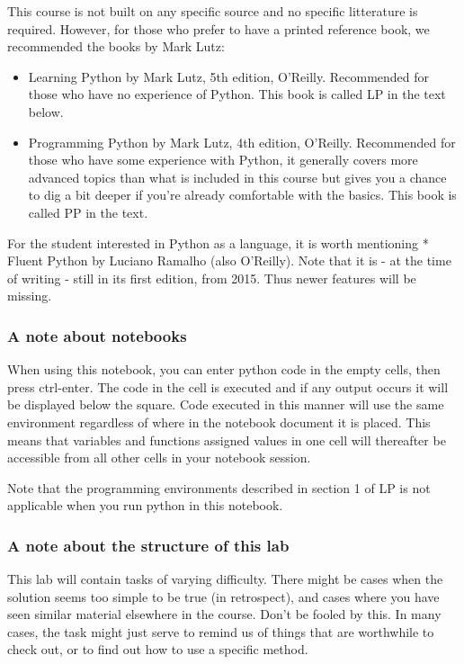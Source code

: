 \documentclass[11pt]{article}
\begin{document}
This course is not built on any specific source and no specific
litterature is required. However, for those who prefer to have a printed
reference book, we recommended the books by Mark Lutz:

\begin{itemize}
\item
  Learning Python by Mark Lutz, 5th edition, O'Reilly. Recommended for
  those who have no experience of Python. This book is called LP in the
  text below.
\item
  Programming Python by Mark Lutz, 4th edition, O'Reilly. Recommended
  for those who have some experience with Python, it generally covers
  more advanced topics than what is included in this course but gives
  you a chance to dig a bit deeper if you're already comfortable with
  the basics. This book is called PP in the text.
\end{itemize}

For the student interested in Python as a language, it is worth
mentioning * Fluent Python by Luciano Ramalho (also O'Reilly). Note that
it is - at the time of writing - still in its first edition, from 2015.
Thus newer features will be missing.

    \subsubsection{A note about notebooks}\label{a-note-about-notebooks}

When using this notebook, you can enter python code in the empty cells,
then press ctrl-enter. The code in the cell is executed and if any
output occurs it will be displayed below the square. Code executed in
this manner will use the same environment regardless of where in the
notebook document it is placed. This means that variables and functions
assigned values in one cell will thereafter be accessible from all other
cells in your notebook session.

Note that the programming environments described in section 1 of LP is
not applicable when you run python in this notebook.

    \subsubsection{A note about the structure of this
lab}\label{a-note-about-the-structure-of-this-lab}

This lab will contain tasks of varying difficulty. There might be cases
when the solution seems too simple to be true (in retrospect), and cases
where you have seen similar material elsewhere in the course. Don't be
fooled by this. In many cases, the task might just serve to remind us of
things that are worthwhile to check out, or to find out how to use a
specific method.
\end{document}
